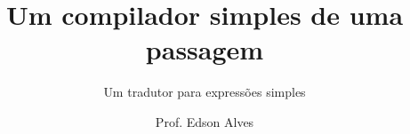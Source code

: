 \title{Um compilador simples de uma passagem}
\subtitle{Um tradutor para expressões simples}
\date{}
\author{Prof. Edson Alves}

